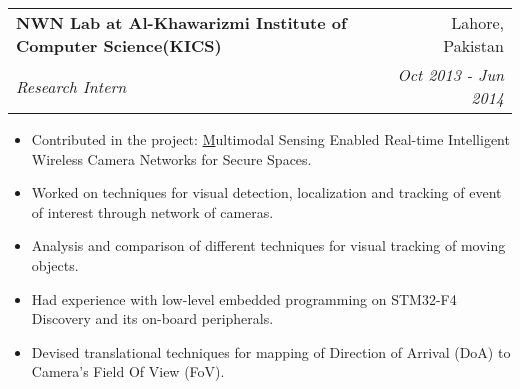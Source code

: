 \documentclass[letterpaper,11pt]{article}
\makeatletter
\newcommand{\resumeItem}[2]{
  \item\small{
    \textbf{#1}{#2 \vspace{-2pt}}
  }
}
\newcommand{\resumeSubheading}[4]{
  \vspace{-1pt}\item
    \begin{tabular*}{0.97\textwidth}{l@{\extracolsep{\fill}}r}
      \textbf{#1} & #2 \\
      \textit{\small#3} & \textit{\small #4} \\
    \end{tabular*}\vspace{-5pt}
}
\newcommand{\resumeItemListStart}{\begin{itemize}}
\newcommand{\resumeItemListEnd}{\end{itemize}\vspace{-5pt}}
\makeatother
\begin{document}
    \resumeSubheading
      {NWN Lab at Al-Khawarizmi Institute of Computer Science(KICS)}{Lahore, Pakistan}
      {Research Intern}{Oct 2013 - Jun 2014} 
      \resumeItemListStart
        \resumeItem{}
          {Contributed in the project: \href{https://www.ignite.org.pk/component/tprojects/project/22.html} Multimodal Sensing Enabled Real-time Intelligent Wireless Camera Networks for Secure Spaces.}
        \resumeItem{}
          {Worked on techniques for visual detection, localization and tracking of event of interest through network of cameras.}
        \resumeItem{}
          {Analysis and comparison of different techniques for visual tracking of moving objects.}
        \resumeItem{}
          {Had experience with low-level embedded programming on STM32-F4 Discovery and its on-board peripherals.}
        \resumeItem{}
          {Devised translational techniques for mapping of Direction of Arrival (DoA) to Camera’s Field Of View (FoV).}
          


      \resumeItemListEnd

\end{document}
